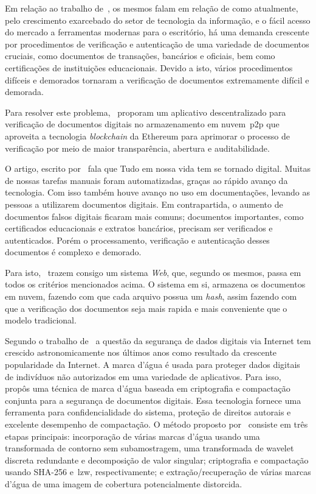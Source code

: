 Em relação ao trabalho de~\textcite{iman2021}, os mesmos falam em relação de
como atualmente, pelo crescimento exarcebado do setor de tecnologia da
informação, e o fácil acesso do mercado a ferramentas modernas para o
escritório, há uma demanda crescente por procedimentos de verificação e
autenticação de uma variedade de documentos cruciais, como documentos de
transações, bancários e oficiais, bem como certificações de instituições
educacionais.
Devido a isto, vários procedimentos difíceis e demorados tornaram a verificação
de documentos extremamente difícil e demorada.

Para resolver este problema,~\textcite{iman2021} proporam um aplicativo \textcite{Web}
descentralizado para verificação de documentos digitais no armazenamento em
nuvem~\acrshort{p2p} que aproveita a tecnologia \textit{blockchain} da
Ethereum para aprimorar o processo de verificação por meio de maior
transparência, abertura e auditabilidade.

O artigo, escrito por~\textcite{shree2022} fala que Tudo em nossa vida tem se
tornado digital.
Muitas de nossas tarefas manuais foram automatizadas, graças ao rápido avanço
da tecnologia.
Com isso também houve avanço no uso em documentações, levando as pessoas a
utilizarem documentos digitais.
Em contrapartida, o aumento de documentos falsos digitais ficaram mais
comuns; documentos importantes, como certificados educacionais e extratos
bancários, precisam ser verificados e autenticados.
Porém o processamento, verificação e autenticação desses documentos é complexo e
demorado.

Para isto,~\textcite{shree2022} trazem consigo um sistema \textit{Web}, que,
segundo os mesmos, passa em todos os critérios mencionados acima.
O sistema em si, armazena os documentos em nuvem, fazendo com que cada
arquivo possua um \textit{hash}\hashfootnote, assim fazendo com que a
verificação dos
documentos seja mais rapida e mais conveniente que o modelo tradicional.

Segundo o trabalho de~\textcite{singh2021} a questão da segurança de dados
digitais via Internet tem crescido astronomicamente nos últimos anos como
resultado da crescente popularidade da Internet.
A marca d'água é usada para proteger dados digitais de indivíduos não
autorizados em uma variedade de aplicativos.
Para isso,~\textcite{singh2021} propôs uma técnica de marca d'água baseada em
criptografia e compactação conjunta para a segurança de documentos digitais.
Essa tecnologia fornece uma ferramenta para confidencialidade do sistema,
proteção de direitos autorais e excelente desempenho de compactação.
O método proposto por~\textcite{singh2021} consiste em três etapas principais:
incorporação de várias marcas d'água usando uma transformada de contorno sem
subamostragem, uma transformada de wavelet discreta redundante e decomposição
de valor singular; criptografia e compactação usando SHA-256 e~\acrfull{lzw},
respectivamente; e extração/recuperação de várias marcas d'água de uma imagem
de cobertura potencialmente distorcida.

